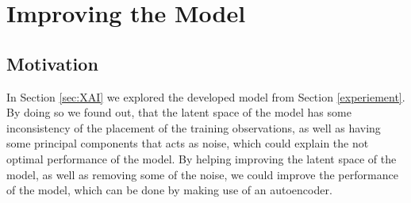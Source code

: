 \documentclass[./main.tex]{subfiles}
\begin{document}
\section{Improving the Model}\label{sec:improving}
\subsection{Motivation}
In Section \ref{sec:XAI} we explored the developed model from Section \ref{experiement}. By doing so we found out, that the latent space of the model has some inconsistency of the placement of the training observations, as well as having some principal components that acts as noise, which could explain the not optimal performance of the model. By helping improving the latent space of the model, as well as removing some of the noise, we could improve the performance of the model, which can be done by making use of an autoencoder.
\end{document}
